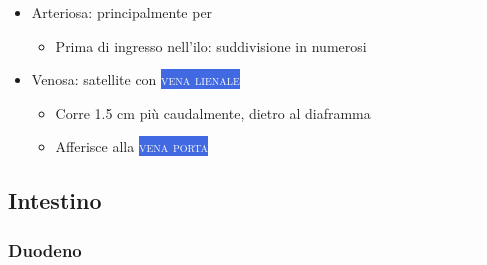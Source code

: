 \documentclass[italian,]{article}
\providecommand{\tightlist}{%
  \setlength{\itemsep}{0pt}\setlength{\parskip}{0pt}}
\newcommand{\ven}[1]{\colorbox{RoyalBlue}{\textcolor{white}{\textsc{#1}}}}
\newcommand{\art}[1]{\colorbox{RedOrange}{\textcolor{white}{\textsc{#1}}}}
\begin{document}
\begin{itemize}
  \begin{itemize}
  \tightlist
  \item
    Arteriosa: principalmente per \art{arteria lienale}

    \begin{itemize}
    \tightlist
    \item
      Prima di ingresso nell'ilo: suddivisione in numerosi
      \art{rami trabecolari}
    \end{itemize}
  \item
    Venosa: satellite con \ven{vena lienale}

    \begin{itemize}
    \tightlist
    \item
      Corre 1.5 cm più caudalmente, dietro al diaframma
    \item
      Afferisce alla \ven{vena porta}
    \end{itemize}
  \end{itemize}
\end{itemize}

\hypertarget{intestino}{%
\subsection{Intestino}\label{intestino}}

\hypertarget{duodeno}{%
\subsubsection{Duodeno}\label{duodeno}}
\end{document}
